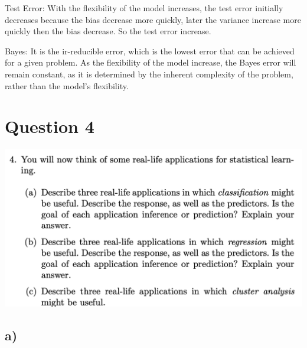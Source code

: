 \documentclass[
]{article}
\begin{document}
Test Error: With the flexibility of the model increases, the test error
initially decreases because the bias decrease more quickly, later the
variance increase more quickly then the bias decrease. So the test error
increase.

Bayes: It is the ir-reducible error, which is the lowest error that can
be achieved for a given problem. As the flexibility of the model
increase, the Bayes error will remain constant, as it is determined by
the inherent complexity of the problem, rather than the model's
flexibility.

\hypertarget{question-4}{%
\section{Question 4}\label{question-4}}

\includegraphics{images/image-1036292975.png}

\hypertarget{a-3}{%
\subsection{a)}\label{a-3}}
\end{document}
